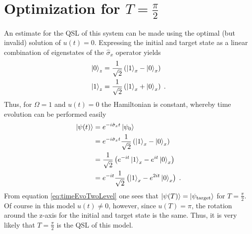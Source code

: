 \section{Optimization for $T = \frac{\pi}{2}$ } 
An estimate for the QSL of this system can be made using the optimal (but invalid) solution of $u(t) = 0$. Expressing the initial and target state as a linear combination of eigenstates of the $\hat{\sigma}_x$ operator yields
\begin{align}
	\ket{0}_z &= \frac{1}{\sqrt{2}} \left( \ket{1}_x - \ket{0}_x \right) \\ 
	\ket{1}_z &= \frac{1}{\sqrt{2}} \left( \ket{1}_x + \ket{0}_x \right) \; .
\end{align}
Thus, for $\Omega = 1$ and $u(t) = 0$ the Hamiltonian is constant, whereby time evolution can be performed easily
\begin{align}
	\ket{\psi (t)} &= e^{-i \hat{\sigma}_x t} \ket{\psi _0} \nonumber \\
	&= e^{-i \hat{\sigma}_x t } \frac{1}{\sqrt{2}} \left( \ket{1}_x - \ket{0}_x \right) \nonumber \\
	&= \frac{1}{\sqrt{2}} \left( e^{-i t} \ket{1}_x - e^{i t} \ket{0}_x \right) \nonumber \\
	&= e^{-i t} \frac{1}{\sqrt{2}} \left( \ket{1}_x - e^{2 i t} \ket{0}_x \right) \; . \label{eq:timeEvoTwoLevel}
\end{align}
From equation \ref{eq:timeEvoTwoLevel} one sees that $\ket{\psi (T)} = \ket{\psi _{\mathrm{target}}}$ for $T = \frac{\pi}{2}$. Of course in this model $u(t) \neq 0$, however, since $u(T) = \pi$, the rotation around the z-axis for the initial and target state is the same. Thus, it is very likely that $T = \frac{\pi}{2}$ is the QSL of this model.\\

